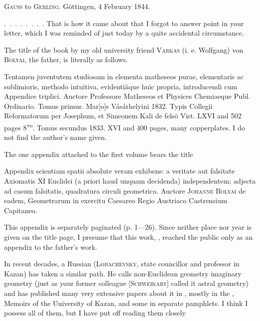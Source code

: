 %
\begin{center}\textsc{Gauss} to \textsc{Gerling}. Göttingen, 4 February 1844.\end{center}

\mbox{.\ .\ .\ .\ .\ .\ .\ .} That is how it came about that I forgot to answer  point in your letter, which I was reminded of just today by a quite accidental circumstance.

The title of the book by my old university friend \textsc{Varkas} (i. e. Wolfgang) von \textsc{Bolyai}, the father, is literally as follows.

Tentamen juventutem studiosam in elementa matheseos purae, elementaris ac sublimioris, methodo intuitiva, evidenti\"aque huic propria, introducendi cum Appendice triplici. Auctore Professore Matheseos et Physices Chemiaeque Publ. Ordinario. Tomus primus. Mar[o]s Vásárhelyini 1832. Typis Collegii Reformatorum per Josephum, et Simeonem Kali de felsö Vist. LXVI and 502 pages 8\textsuperscript{vo}. Tomus secundus 1833. XVI and 400 pages, many copperplates. I do not find the author's name given.

The one appendix attached to the first volume bears the title

Appendix scientiam spatii absolute veram exhibens: a veritate aut falsitate Axiomatis XI Euclidei (a priori haud unquam decidenda) independentem; adjecta ad casum falsitatis, quadratura circuli geometrica. Auctore \textsc{Johanne} \textsc{Bolyai} de eadem, Geometrarum in exercitu Caesareo Regio Austriaco Castrensium Capitaneo.

This appendix is separately paginated (p. 1---26). Since neither place nor year is given on the title page, I presume that this work, , reached the public only as an appendix to the father's work.

In recent decades, a Russian (\textsc{Lobachevsky}, state councillor and professor in Kazan) has taken a similar path. He calls non-Euclidean geometry imaginary geometry (just as your former colleague [\textsc{Schweikart}] called it astral geometry) and has published many very extensive papers about it in , mostly in the , Memoirs of the University of Kazan, and some in separate pamphlets. I think I possess all of them, but I have put off reading them closely
